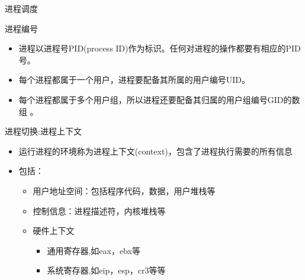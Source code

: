 \begin{frame}{进程调度}
\begin{center}\end{center}
\end{frame}


\begin{frame}{进程编号}
\begin{itemize}
\item 进程以进程号PID(process ID)作为标识。任何对进程的操作都要有相应的PID号。
\item 每个进程都属于一个用户，进程要配备其所属的用户编号UID。
\item 每个进程都属于多个用户组，所以进程还要配备其归属的用户组编号GID的数组 。
\end{itemize}
\end{frame}


\begin{frame}{进程切换:进程上下文}
\begin{itemize}
\item 运行进程的环境称为进程上下文(context)，包含了进程执行需要的所有信息
\item 包括：
\begin{itemize}
\item 用户地址空间：包括程序代码，数据，用户堆栈等
\item 控制信息：进程描述符，内核堆栈等
\item 硬件上下文
\begin{itemize}
\item 通用寄存器,如eax，ebx等
\item 系统寄存器,如eip，esp，cr3等等
\end{itemize}
\end{itemize}
\end{itemize}
\end{frame}

